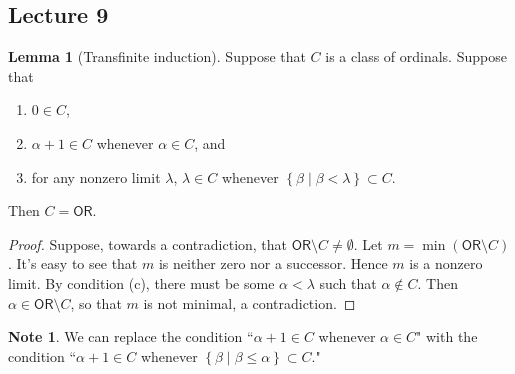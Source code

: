\documentclass[10pt,letterpaper,cm]{nupset}
\theoremstyle{definition}
\newtheorem{note}[definition]{Note}
\theoremstyle{theorem}
\newtheorem{lemma}[definition]{Lemma}
\theoremstyle{remark}
\newcommand{\1}{\mathbf{1}}
\newcommand{\0}{\vec 0}
\newcommand{\ord}{\mathsf{OR}}
\begin{document}
\subsection{Lecture 9}

\begin{lemma}[Transfinite induction]
Suppose that $C$ is a class of ordinals. Suppose that
\begin{enumerate}[label = (\alph*)]
\item $0\in C$,
\item $\alpha +1 \in C$ whenever $\alpha \in C$, and
\item for any nonzero limit $\lambda$, $\lambda \in C$ whenever $\left\{\beta \mid \beta < \lambda\right\} \subset C$. 
\end{enumerate}
Then $C = \ord$. 
\end{lemma}
\begin{proof}
Suppose, towards a contradiction, that $\ord \setminus C \ne \emptyset$. Let $m = \min(\ord \setminus C)$. It's easy to see that $ m$ is neither zero nor a successor. Hence $m$ is a nonzero limit. By condition (c), there must be some $\alpha < \lambda$ such that $\alpha \notin C$. Then $\alpha \in \ord \setminus C$, so that $m$ is not minimal, a contradiction. 
\end{proof}

\begin{note}
We can replace the condition ``$\alpha +1 \in C$ whenever $\alpha \in C$" with the condition ``$\alpha +1 \in C$ whenever $\left\{\beta \mid \beta \leq \alpha\right\} \subset C$."
\end{note}
\end{document}
